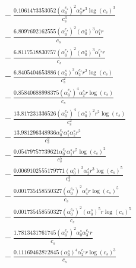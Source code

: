 \documentclass[10pt]{article}
\begin{document}
\begin{align*}
&{}  - \frac{0.1061473353052 \left(\alpha_{0}^{c_s}\right)^{2} \alpha_{2}^s r^{3} \log{\left(c_{s} \right)}^{3}}{c_{s}^{3}} \\
&{}  - \frac{6.8097692162555 \left(\alpha_{0}^{c_s}\right)^{2} \left(\alpha_{0}^s\right)^{3} \alpha_{1}^s r}{c_{s}} \\
&{}  - \frac{6.8117518830757 \left(\alpha_{0}^{c_s}\right)^{2} \left(\alpha_{0}^s\right)^{3} \alpha_{1}^{c_s} r}{c_{s}} \\
&{}  - \frac{6.8405404653886 \left(\alpha_{0}^s\right)^{3} \alpha_{2}^{c_s} r^{2} \log{\left(c_{s} \right)}}{c_{s}^{2}} \\
&{}  - \frac{0.85840688998375 \left(\alpha_{0}^{c_s}\right)^{4} \alpha_{2}^s r \log{\left(c_{s} \right)}}{c_{s}} \\
&{}  - \frac{13.817231336526 \left(\alpha_{0}^{c_s}\right)^{4} \left(\alpha_{0}^s\right)^{2} r^{2} \log{\left(c_{s} \right)}}{c_{s}^{2}} \\
&{}  - \frac{13.981296348936 \alpha_{0}^{c_s} \alpha_{1}^s \alpha_{2}^s r^{2}}{c_{s}^{2}} \\
&{}  - \frac{0.05479757739621 \alpha_{0}^{c_s} \alpha_{1}^s r^{5} \log{\left(c_{s} \right)}^{2}}{c_{s}^{5}} \\
&{}  - \frac{0.0069102555179771 \left(\alpha_{0}^s\right)^{2} \alpha_{2}^s r^{3} \log{\left(c_{s} \right)}^{5}}{c_{s}^{3}} \\
&{}  - \frac{0.001735458550327 \left(\alpha_{0}^{c_s}\right)^{2} \alpha_{4}^s r \log{\left(c_{s} \right)}^{5}}{c_{s}} \\
&{}  - \frac{0.001735458550327 \left(\alpha_{0}^{c_s}\right)^{2} \left(\alpha_{0}^s\right)^{5} r \log{\left(c_{s} \right)}^{5}}{c_{s}} \\
&{}  - \frac{1.7813431761745 \left(\alpha_{0}^{c_s}\right)^{2} \alpha_{0}^s \alpha_{3}^{c_s} r}{c_{s}} \\
&{}  - \frac{0.11169462872845 \left(\alpha_{0}^s\right)^{4} \alpha_{2}^{c_s} r \log{\left(c_{s} \right)}^{3}}{c_{s}}
\end{align*}
\end{document}
